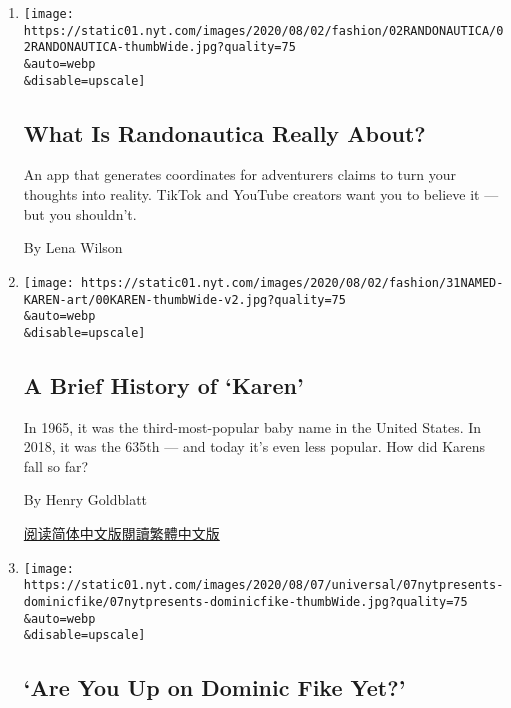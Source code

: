 \begin{enumerate}
\def\labelenumi{\arabic{enumi}.}
\item
  \href{/2020/07/31/style/randonautica-app.html}{}

  \texttt{[image: https://static01.nyt.com/images/2020/08/02/fashion/02RANDONAUTICA/02RANDONAUTICA-thumbWide.jpg?quality=75\\\&auto=webp\\\&disable=upscale]}

  \hypertarget{what-is-randonautica-really-about}{%
  \subsection{What Is Randonautica Really
  About?}\label{what-is-randonautica-really-about}}

  An app that generates coordinates for adventurers claims to turn your
  thoughts into reality. TikTok and YouTube creators want you to believe
  it --- but you shouldn't.

  By Lena Wilson
\item
  \href{/2020/07/31/style/karen-name-meme-history.html}{}

  \texttt{[image: https://static01.nyt.com/images/2020/08/02/fashion/31NAMED-KAREN-art/00KAREN-thumbWide-v2.jpg?quality=75\\\&auto=webp\\\&disable=upscale]}

  \hypertarget{a-brief-history-of-karen}{%
  \subsection{A Brief History of
  `Karen'}\label{a-brief-history-of-karen}}

  In 1965, it was the third-most-popular baby name in the United States.
  In 2018, it was the 635th --- and today it's even less popular. How
  did Karens fall so far?

  By Henry Goldblatt

  \href{https://cn.nytimes.com/culture/20200805/karen-name-meme-history/}{阅读简体中文版}\href{https://cn.nytimes.com/culture/20200805/karen-name-meme-history/zh-hant/}{閱讀繁體中文版}
\item
  \href{/article/dominic-fike-at-first.html}{}

  \texttt{[image: https://static01.nyt.com/images/2020/08/07/universal/07nytpresents-dominicfike/07nytpresents-dominicfike-thumbWide.jpg?quality=75\\\&auto=webp\\\&disable=upscale]}

  \hypertarget{are-you-up-on-dominic-fike-yet}{%
  \subsection{`Are You Up on Dominic Fike
  Yet?'}\label{are-you-up-on-dominic-fike-yet}}


\end{enumerate}
